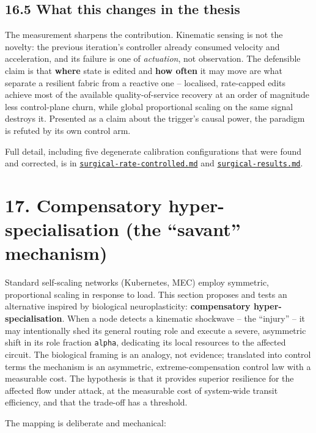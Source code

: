 \documentclass[
  american,
  11pt,
]{article}
\begin{document}
\subsection{16.5 What this changes in the
thesis}\label{what-this-changes-in-the-thesis}

The measurement sharpens the contribution. Kinematic sensing is not the
novelty: the previous iteration's controller already consumed velocity
and acceleration, and its failure is one of \emph{actuation}, not
observation. The defensible claim is that \textbf{where} state is edited
and \textbf{how often} it may move are what separate a resilient fabric
from a reactive one -- localised, rate-capped edits achieve most of the
available quality-of-service recovery at an order of magnitude less
control-plane churn, while global proportional scaling on the same
signal destroys it. Presented as a claim about the trigger's causal
power, the paradigm is refuted by its own control arm.

Full detail, including five degenerate calibration configurations that
were found and corrected, is in
\href{surgical-rate-controlled.md}{\texttt{surgical-rate-controlled.md}}
and \href{surgical-results.md}{\texttt{surgical-results.md}}.

\section{17. Compensatory hyper-specialisation (the ``savant''
mechanism)}\label{compensatory-hyper-specialisation-the-savant-mechanism}

Standard self-scaling networks (Kubernetes, MEC) employ symmetric,
proportional scaling in response to load. This section proposes and
tests an alternative inspired by biological neuroplasticity:
\textbf{compensatory hyper-specialisation}. When a node detects a
kinematic shockwave -- the ``injury'' -- it may intentionally shed its
general routing role and execute a severe, asymmetric shift in its role
fraction \texttt{alpha}, dedicating its local resources to the affected
circuit. The biological framing is an analogy, not evidence; translated
into control terms the mechanism is an asymmetric, extreme-compensation
control law with a measurable cost. The hypothesis is that it provides
superior resilience for the affected flow under attack, at the
measurable cost of system-wide transit efficiency, and that the
trade-off has a threshold.

The mapping is deliberate and mechanical:
\end{document}
